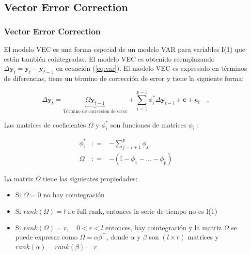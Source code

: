 \documentclass{beamer}
\begin{document}
        \subsection{Vector Error Correction}
            \begin{frame}
            \frametitle{Vector Error Correction}
            El modelo VEC es una forma especial de un modelo VAR para variables I(1) que
            están también cointegradas. El modelo VEC es obtenido reemplazando
            $\Delta \mathbf{y}_t = \mathbf{y}_t - \mathbf{y}_{t-1}$ en ecuación
            (\ref{eq:var}). El modelo VEC es expresado en términos de diferencias,
            tiene un término de corrección de error y tiene la siguiente forma:
            
            \begin{equation}
             \label{eq:vec}
             \Delta \mathbf{y}_t = 
             \underbrace{ \Omega\mathbf{y}_{t-1}}_\text{Término de corrección de error} + 
             \sum_{i=1}^{p-1}
             \phi_i^* \Delta \mathbf{y}_{t-i}  + \mathbf{c} + \mathbf{\epsilon}_t \quad ,
            \end{equation}

            \end{frame}
            \begin{frame}
            Las matrices de coeficientes $\Omega$ y $\phi_i^*$ son
            funciones de matrices $\phi_i$ :
            
            \begin{eqnarray*}
            \phi_i^* &: =& -\sum_{j=i+1}^{p} \phi_j \\
            \Omega &: =& -(\mathbb{I}-\phi_1-\dots-\phi_p) 
            \end{eqnarray*}
            
            La matriz $\Omega$ tiene las siguientes propiedades:
            \begin{itemize}
            \item Si $\Omega = 0$ no hay cointegración
            \item Si $rank(\Omega)=l$ i.e full rank, entonces la serie de tiempo no es I(1)
            \item Si $rank(\Omega)=r,\quad 0 < r < l$ entonces, hay cointegración
            y la matriz $\Omega$ se puede expresar como $\Omega =
            \alpha \beta^\intercal$, donde $\alpha$ y $\beta$ son $(l \times r)$
            matrices y $rank(\alpha)=rank(\beta)=r$.
            \end{itemize}

            \end{frame}
\end{document}
